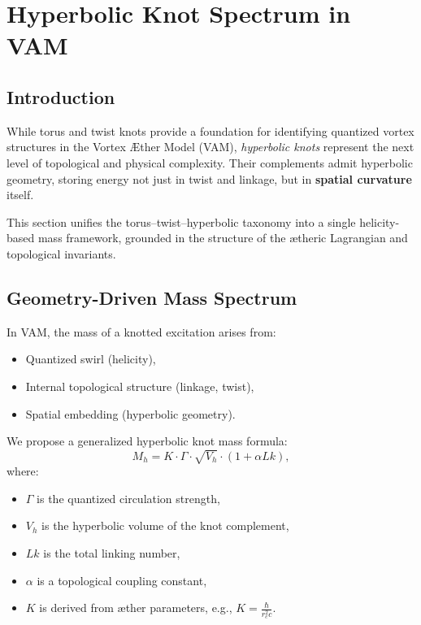 \section{Hyperbolic Knot Spectrum in VAM}
\label{sec:hyperbolic_knot_spectrum}

\subsection{Introduction}

While torus and twist knots provide a foundation for identifying quantized vortex structures in the Vortex Æther Model (VAM), \emph{hyperbolic knots} represent the next level of topological and physical complexity. Their complements admit hyperbolic geometry, storing energy not just in twist and linkage, but in \textbf{spatial curvature} itself.

This section unifies the torus--twist--hyperbolic taxonomy into a single helicity-based mass framework, grounded in the structure of the ætheric Lagrangian and topological invariants.

\subsection{Geometry-Driven Mass Spectrum}

In VAM, the mass of a knotted excitation arises from:
\begin{itemize}
    \item Quantized swirl (helicity),
    \item Internal topological structure (linkage, twist),
    \item Spatial embedding (hyperbolic geometry).
\end{itemize}

We propose a generalized hyperbolic knot mass formula:
\begin{equation}
    M_h = K \cdot \Gamma \cdot \sqrt{V_h} \cdot \left(1 + \alpha Lk\right),
\end{equation}
where:
\begin{itemize}
    \item $\Gamma$ is the quantized circulation strength,
    \item $V_h$ is the hyperbolic volume of the knot complement,
    \item $Lk$ is the total linking number,
    \item $\alpha$ is a topological coupling constant,
    \item $K$ is derived from æther parameters, e.g., $K = \frac{\hbar}{r_c^2 c}$.
\end{itemize}

